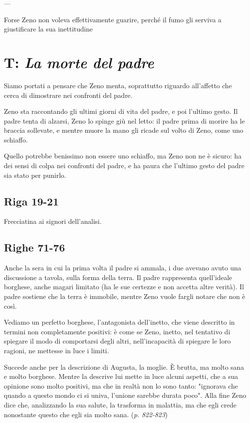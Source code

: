 ---

Forse Zeno non voleva effettivamente guarire, perché il fumo gli serviva a giustificare la sua inettitudine

\section{T: \textit{La morte del padre}}

Siamo portati a pensare che Zeno menta, soprattutto riguardo all'affetto che cerca di dimostrare nei confronti del padre.

Zeno sta raccontando gli ultimi giorni di vita del padre, e poi l'ultimo gesto. Il padre tenta di alzarsi, Zeno lo spinge giù nel letto: il padre prima di morire ha le braccia sollevate, e mentre muore la mano gli ricade sul volto di Zeno, come uno schiaffo.

Quello potrebbe benissimo non essere uno schiaffo, ma Zeno non ne è sicuro: ha dei sensi di colpa nei confronti del padre, e ha paura che l'ultimo gesto del padre sia stato per punirlo.

\subsection{Riga 19-21}

Frecciatina ai signori dell'analisi.

\subsection{Righe 71-76}

Anche la sera in cui la prima volta il padre si ammala, i due avevano avuto una discussione a tavola, sulla forma della terra. Il padre rappresenta quell'ideale borghese, anche magari limitato (ha le sue certezze e non accetta altre verità). Il padre sostiene che la terra è immobile, mentre Zeno vuole fargli notare che non è così.

Vediamo un perfetto borghese, l'antagonista dell'inetto, che viene descritto in termini non completamente positivi: è come se Zeno, inetto, nel tentativo di spiegare il modo di comportarsi degli altri, nell'incapacità di spiegare le loro ragioni, ne mettesse in luce i limiti.

Succede anche per la descrizione di Augusta, la moglie. È brutta, ma molto sana e molto borghese. Mentre la descrive lui mette in luce alcuni aspetti, che a sua opinione sono molto positivi, ma che in realtà non lo sono tanto: "ignorava che quando a questo mondo ci si univa, l'unione sarebbe durata poco". Alla fine Zeno dice che, analizzando la sua salute, la trasforma in malattia, ma che egli crede nonostante questo che egli sia molto sana. (\emph{p. 822-823})

